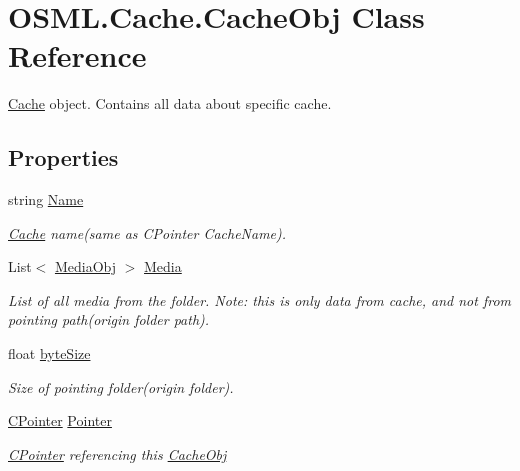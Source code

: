 \hypertarget{classOSML_1_1Cache_1_1CacheObj}{}\section{O\+S\+M\+L.\+Cache.\+Cache\+Obj Class Reference}
\label{classOSML_1_1Cache_1_1CacheObj}


\mbox{\hyperlink{namespaceOSML_1_1Cache}{Cache}} object. Contains all data about specific cache.  


\subsection*{Properties}
\begin{DoxyCompactItemize}
\item 
string \mbox{\hyperlink{classOSML_1_1Cache_1_1CacheObj_af06e3c3cfcffbd3d602f4eedf3ba08fa}{Name}}
\begin{DoxyCompactList}\small\item\em \mbox{\hyperlink{namespaceOSML_1_1Cache}{Cache}} name(same as C\+Pointer Cache\+Name). \end{DoxyCompactList}\item 
List$<$ \mbox{\hyperlink{classOSML_1_1Media_1_1MediaObj}{Media\+Obj}} $>$ \mbox{\hyperlink{classOSML_1_1Cache_1_1CacheObj_afd71e5729f4e76e9efb5f97da8c0f0ad}{Media}}
\begin{DoxyCompactList}\small\item\em List of all media from the folder. Note\+: this is only data from cache, and not from pointing path(origin folder path). \end{DoxyCompactList}\item 
float \mbox{\hyperlink{classOSML_1_1Cache_1_1CacheObj_ab5679dce3f7647572c4e3b84bd35efb8}{byte\+Size}}
\begin{DoxyCompactList}\small\item\em Size of pointing folder(origin folder). \end{DoxyCompactList}\item 
\mbox{\hyperlink{classOSML_1_1Cache_1_1CPointer}{C\+Pointer}} \mbox{\hyperlink{classOSML_1_1Cache_1_1CacheObj_a2dddda06275f188b9db7e813b87f2c96}{Pointer}}
\begin{DoxyCompactList}\small\item\em \mbox{\hyperlink{classOSML_1_1Cache_1_1CPointer}{C\+Pointer}} referencing this \mbox{\hyperlink{classOSML_1_1Cache_1_1CacheObj}{Cache\+Obj}} \end{DoxyCompactList}\end{DoxyCompactItemize}



